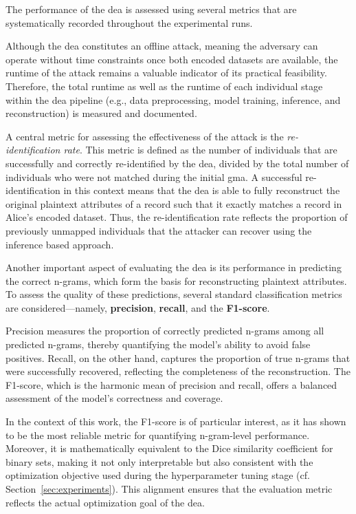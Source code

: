 The performance of the \ac{dea} is assessed using several metrics that are systematically recorded throughout the experimental runs.

Although the \ac{dea} constitutes an offline attack, meaning the adversary can operate without time constraints once both encoded datasets are available, the runtime of the attack remains a valuable indicator of its practical feasibility.
Therefore, the total runtime as well as the runtime of each individual stage within the \ac{dea} pipeline (e.g., data preprocessing, model training, inference, and reconstruction) is measured and documented.

A central metric for assessing the effectiveness of the attack is the \emph{re-identification rate}.
This metric is defined as the number of individuals that are successfully and correctly re-identified by the \ac{dea}, divided by the total number of individuals who were not matched during the initial \ac{gma}.
A successful re-identification in this context means that the \ac{dea} is able to fully reconstruct the original plaintext attributes of a record such that it exactly matches a record in Alice's encoded dataset.
Thus, the re-identification rate reflects the proportion of previously unmapped individuals that the attacker can recover using the inference based approach.

Another important aspect of evaluating the \ac{dea} is its performance in predicting the correct n-grams, which form the basis for reconstructing plaintext attributes.
To assess the quality of these predictions, several standard classification metrics are considered—namely, \textbf{precision}, \textbf{recall}, and the \textbf{F1-score}.

Precision measures the proportion of correctly predicted n-grams among all predicted n-grams, thereby quantifying the model’s ability to avoid false positives.
Recall, on the other hand, captures the proportion of true n-grams that were successfully recovered, reflecting the completeness of the reconstruction.
The F1-score, which is the harmonic mean of precision and recall, offers a balanced assessment of the model's correctness and coverage.

In the context of this work, the F1-score is of particular interest, as it has shown to be the most reliable metric for quantifying n-gram-level performance.
Moreover, it is mathematically equivalent to the Dice similarity coefficient for binary sets, making it not only interpretable but also consistent with the optimization objective used during the hyperparameter tuning stage (cf. Section~\ref{sec:experiments}).
This alignment ensures that the evaluation metric reflects the actual optimization goal of the \ac{dea}.

